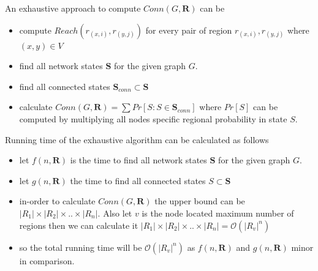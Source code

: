 \documentclass[12pt]{article}
\begin{document}
An exhaustive approach to compute $Conn(G,\textbf{R})$ can be 
\begin{itemize}[noitemsep,nolistsep]
\item compute $Reach(r_{(x,i)},r_{(y,j)})$ for every pair of region $r_{(x,i)}, r_{(y,j)}$ where $(x,y)\in V$
\item find all network states $\textbf{S}$ for the given graph $G$.
\item find all connected states $\textbf{S}_{conn}\subset\textbf{S}$ 
\item calculate $Conn(G,\textbf{R})= \sum Pr[S:S\in \textbf{S}_{conn}]$ where $Pr[S]$ can be computed by multiplying all nodes specific regional probability in state $S$.
\end{itemize}
Running time of the exhaustive algorithm can be calculated as follows
\begin{itemize}[noitemsep,nolistsep]
\item let $f(n,\textbf{R})$ is the time to find all network states $\textbf{S}$ for the given graph $G$.
\item let $g(n,\textbf{R})$ the time to find all connected states $S\subset\textbf{S}$
\item in-order to calculate $Conn(G,\textbf{R})$ the upper bound can be $|R_1|\times|R_2|\times..\times|R_n|$. Also let $v$ is the node located maximum number of regions then we can calculate it $|R_1|\times|R_2|\times..\times|R_n|=\mathcal{O}(|R_v|^n)$
\item so the total running time will be $\mathcal{O}(|R_v|^n)$ as $f(n,\textbf{R})$ and $g(n,\textbf{R})$ minor in comparison.
\end{itemize}

\end{document}
